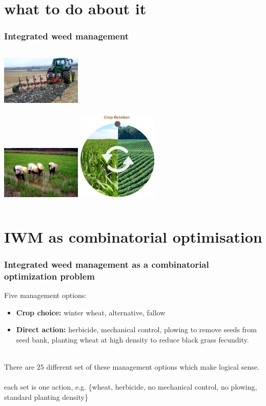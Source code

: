 \documentclass[]{beamer}
\begin{document}
\section{what to do about it}
\begin{frame}
	\frametitle{Integrated weed management}
	 \begin{columns}[c] %
	 \column{2.5in}
	 	\includegraphics[width=1.5in]{Plowing_ecomat}
	 	\\~\\
	 	\includegraphics[width=1.5in]{weeds-manual-hand}	
	 \column{2.5in}
	 	\includegraphics[width=1.5in]{crop-rotation}
	 \end{columns}
\end{frame}

\section{IWM as combinatorial optimisation}  
  \begin{frame}
    \frametitle{Integrated weed management as a combinatorial optimization problem}
    Five management options:
    \begin{itemize}
      \item \textbf{Crop choice:} winter wheat, alternative, fallow
      \item \textbf{Direct action:} herbicide, mechanical control, plowing to remove seeds from seed bank, planting wheat at high density to reduce black grass fecundity.  
    \end{itemize}       
    ~\\
    There are 25 different set of these management options which make logical sense.
    \\~\\
    each set is one action, e.g. \{wheat, herbicide, no mechanical control, no plowing, standard planting density\}  
  \end{frame}
  
\end{document}
